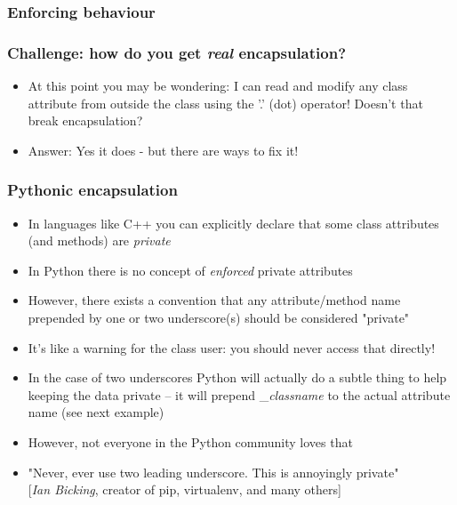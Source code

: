 \documentclass[9pt]{beamer}
\begin{document}
\begin{frame}
  \frametitle{Enforcing behaviour}
  
\end{frame}


\begin{frame}
  \frametitle{Challenge: how do you get \emph{real} encapsulation?}
  \begin{itemize}
    \item At this point you may be wondering: I can read and modify any class attribute
          from outside the class using the '.' (dot) operator!
          Doesn't that break encapsulation?

    \bigskip

    \item Answer: Yes it does - but there are ways to fix it!
  \end{itemize}
\end{frame}


\begin{frame}
  \frametitle{Pythonic encapsulation}

  \begin{itemize}
    \item In languages like C++ you can explicitly declare that some class
          attributes (and methods) are \emph{private}
    \smallskip
    \item In Python there is no concept of \emph{enforced} private attributes
    \smallskip
    \item However, there exists a convention that any attribute/method name prepended by one or two underscore(s) should be considered "private"
    \smallskip
    \item It's like a warning for the class user: you should never access that directly!
    \smallskip
    \item In the case of two underscores Python will actually do a subtle thing to help keeping the data private -- it will
          prepend \_\emph{classname} to the actual attribute name (see next example)
    \smallskip
    \item However, not everyone in the Python community loves that
    \smallskip
    \item "Never, ever use two leading underscore. This is annoyingly private"\\
           \vspace{0.02\textheight}
           \footnotesize [\emph{Ian Bicking}, creator of pip, virtualenv, and many others]
  \end{itemize}

\end{frame}
\end{document}
